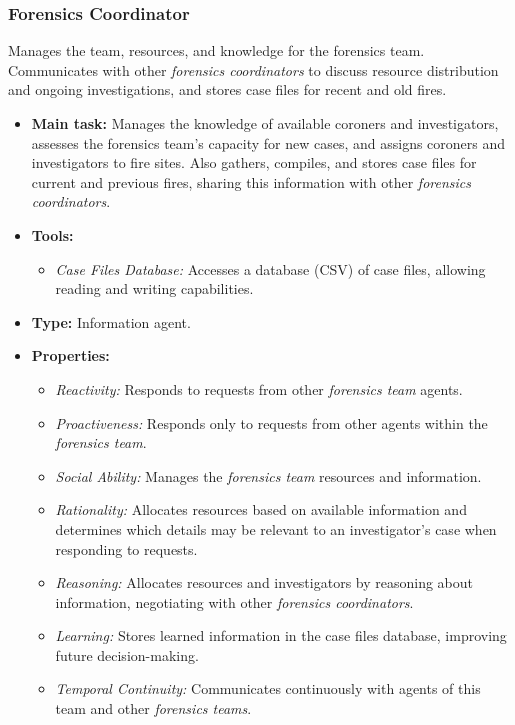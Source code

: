 \subsubsection{Forensics Coordinator}
Manages the team, resources, and knowledge for the forensics team. Communicates with other \textit{forensics coordinators} to discuss resource distribution and ongoing investigations, and stores case files for recent and old fires.
\begin{itemize}
    \item \textbf{Main task:} Manages the knowledge of available coroners and investigators, assesses the forensics team's capacity for new cases, and assigns coroners and investigators to fire sites. Also gathers, compiles, and stores case files for current and previous fires, sharing this information with other \textit{forensics coordinators}.
    \item \textbf{Tools:}
    \begin{itemize}
        \item \textit{Case Files Database:} Accesses a database (CSV) of case files, allowing reading and writing capabilities.
    \end{itemize}
    \item \textbf{Type:} Information agent.
    \item \textbf{Properties:}
    \begin{itemize}
        \item \textit{Reactivity:} Responds to requests from other \textit{forensics team} agents.
        \item \textit{Proactiveness:} Responds only to requests from other agents within the \textit{forensics team}.
        \item \textit{Social Ability:} Manages the \textit{forensics team} resources and information.
        \item \textit{Rationality:} Allocates resources based on available information and determines which details may be relevant to an investigator's case when responding to requests.
        \item \textit{Reasoning:} Allocates resources and investigators by reasoning about information, negotiating with other \textit{forensics coordinators}.
        \item \textit{Learning:} Stores learned information in the case files database, improving future decision-making.
        \item \textit{Temporal Continuity:} Communicates continuously with agents of this team and other \textit{forensics teams}.
    \end{itemize}
\end{itemize}

